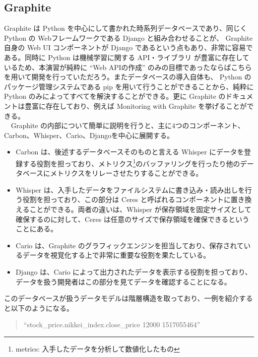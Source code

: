 \documentclass{scrartcl}
\begin{document}
\subsection{Graphite}
\label{sec:org0e1f355}
Graphite は Python を中心にして書かれた時系列データベースであり、同じく Python の Webフレームワークである Django と組み合わせることが、 Graphite 自身の Web UI コンポーネントが Django であるという点もあり、非常に容易である。同時に Python は機械学習に関する API・ライブラリ が豊富に存在しているため、本演習が純粋に ``Web APIの作成'' のみの目標であったならばこちらを用いて開発を行っていただろう。またデータベースの導入自体も、 Python のパッケージ管理システムである pip を用いて行うことができることから、純粋に Python のみによってすべてを解決することができる。更に Graphite のドキュメントは豊富に存在しており、例えば Monitoring with Graphite \cite{graphite-oreilly} を挙げることができる。\\
　Graphite の内部について簡単に説明を行うと、主に4つのコンポーネント、Carbon、Whisper、Cario、Djangoを中心に展開する。\\
\begin{itemize}
\item Carbon は、後述するデータベースそのものと言える Whisper にデータを登録する役割を担っており、メトリクス\footnote[1]{metrics: 入手したデータを分析して数値化したもの}のバッファリングを行ったり他のデータベースにメトリクスをリレーさせたりすることができる。\\
\item Whisper は、入手したデータをファイルシステムに書き込み・読み出しを行う役割を担っており、この部分は Ceres と呼ばれるコンポーネントに置き換えることができる。両者の違いは、Whisper が保存領域を固定サイズとして確保するのに対して、Ceres は任意のサイズで保存領域を確保できるということにある。\\
\item Cario は、Graphite のグラフィックエンジンを担当しており、保存されているデータを視覚化する上で非常に重要な役割を果たしている。\\
\item Django は、Cario によって出力されたデータを表示する役割を担っており、データを扱う開発者はこの部分を見てデータを確認することになる。\\
\end{itemize}

このデータベースが扱うデータモデルは階層構造を取っており、一例を紹介すると以下のようになる。\\
\begin{verse}
``stock\_price.nikkei\_index.close\_price 12000 1517055464''\\
\end{verse}
\end{document}
